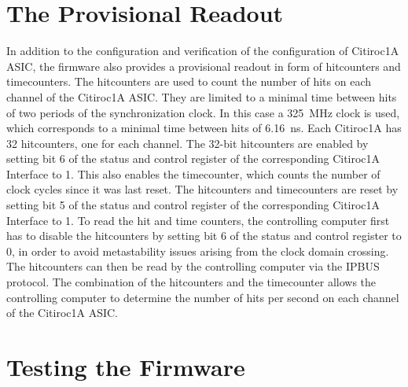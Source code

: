 \section{The Provisional Readout}
In addition to the configuration and verification of the configuration of Citiroc1A ASIC, the firmware also provides a provisional readout in form of hitcounters and timecounters. 
\newline
The hitcounters are used to count the number of hits on each channel of the Citiroc1A ASIC.
\newline
They are limited to a minimal time between hits of two periods of the synchronization clock.
In this case a \SI{325}{\mega\hertz} clock is used, which corresponds to a minimal time between hits of \SI{6.16}{\nano\second}.
\newline
Each Citiroc1A has 32 hitcounters, one for each channel.
The 32-bit hitcounters are enabled by setting bit 6 of the status and control register of the corresponding Citiroc1A Interface to 1. 
This also enables the timecounter, which counts the number of clock cycles since it was last reset. 
\newline
The hitcounters and timecounters are reset by setting bit 5 of the status and control register of the corresponding Citiroc1A Interface to 1.
\newline
To read the hit and time counters, the controlling computer first has to disable the hitcounters by setting bit 6 of the status and control register to 0, in order to avoid metastability issues arising from the clock domain crossing.
The hitcounters can then be read by the controlling computer via the IPBUS protocol.
\newline
The combination of the hitcounters and the timecounter allows the controlling computer to determine the number of hits per second on each channel of the Citiroc1A ASIC. 


\section{Testing the Firmware}
